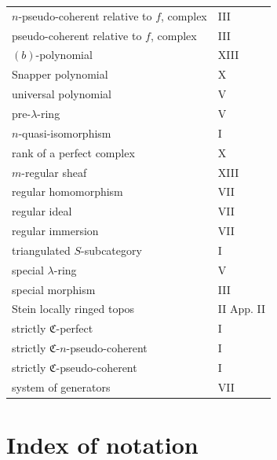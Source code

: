 \documentclass[11pt]{article}
\theoremstyle{plain}
\theoremstyle{definition}
\theoremstyle{remark}
\begin{document}
\begin{longtable}{p{8.5cm}l}
$n$-pseudo-coherent relative to $f$, complex & III\\
pseudo-coherent relative to $f$, complex & III\\
$(b)$-polynomial & XIII\\
Snapper polynomial & X\\
universal polynomial & V\\
pre-$\lambda$-ring & V\\
$n$-quasi-isomorphism & I\\
rank of a perfect complex & X\\
$m$-regular sheaf & XIII\\
regular homomorphism & VII\\
regular ideal & VII\\
regular immersion & VII\\
triangulated $S$-subcategory & I\\
special $\lambda$-ring & V\\
special morphism & III\\
Stein locally ringed topos & II App. II\\
strictly $\mathfrak C$-perfect & I\\
strictly $\mathfrak C$-$n$-pseudo-coherent & I\\
strictly $\mathfrak C$-pseudo-coherent & I\\
system of generators & VII\\
\bottomrule
\end{longtable}

\newpage
\section*{Index of notation}
\end{document}
